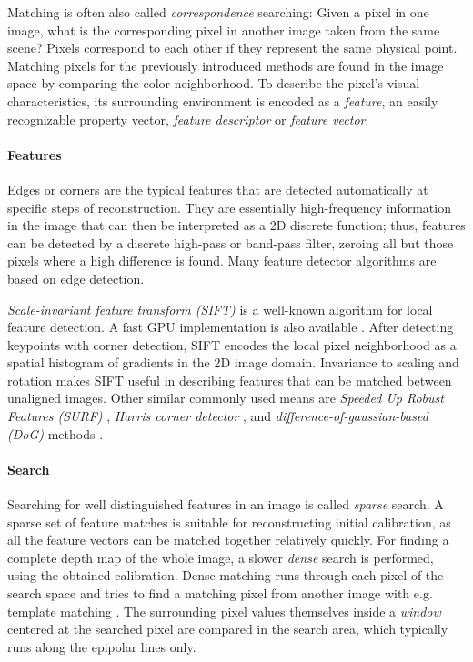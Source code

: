 Matching is often also called \emph{correspondence} searching:
Given a pixel in one image, what is the corresponding pixel in another image taken from the same scene?
Pixels correspond to each other if they represent the same physical point.
Matching pixels for the previously introduced methods are found in the image space by comparing the color neighborhood.
To describe the pixel's visual characteristics, its surrounding environment is encoded as a \emph{feature}, an easily recognizable property vector, \emph{feature descriptor} or \emph{feature vector}.
\cite[ch. 4]{szeliski10vision}

\paragraph{Features}
Edges or corners are the typical features that are detected automatically at specific steps of reconstruction.
They are essentially high-frequency information in the image that can then be interpreted as a 2D discrete function; thus, features can be detected by a discrete high-pass or band-pass filter, zeroing all but those pixels where a high difference is found. \cite{marr1980theory}
Many feature detector algorithms are based on edge detection. %

\emph{Scale-invariant feature transform (SIFT)} \cite{lowe1999object} is a well-known algorithm for local feature detection.
A fast GPU implementation is also available \cite{changchang2007siftgpu}.
After detecting keypoints with corner detection, SIFT encodes the local pixel neighborhood as a spatial histogram of gradients in the 2D image domain.
Invariance to scaling and rotation makes SIFT useful in describing features that can be matched between unaligned images.
Other similar commonly used means are \emph{Speeded Up Robust Features (SURF)} \cite{bay2006surf}, \emph{Harris corner detector} \cite{harris1988combined}, and \emph{difference-of-gaussian-based (DoG)} methods \cite[p. 152]{szeliski10vision}.

\paragraph{Search}
Searching for well distinguished features in an image is called \emph{sparse} search.
A sparse set of feature matches is suitable for reconstructing initial calibration, as all the feature vectors can be matched together relatively quickly.
For finding a complete depth map of the whole image, a slower \emph{dense} search is performed, using the obtained calibration.
Dense matching runs through each pixel of the search space and tries to find a matching pixel from another image with e.g. template matching \cite{duda1973pattern}.
The surrounding pixel values themselves inside a \emph{window} centered at the searched pixel are compared in the search area, which typically runs along the epipolar lines only.

